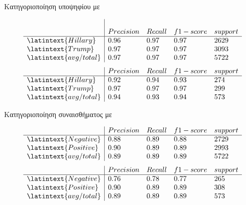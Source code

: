 \documentclass{beamer}
\begin{document}
\begin{frame}
\begin{flushleft}
{\color{blue}Κατηγοριοποίηση υποψηφίου με {}} 
\end{flushleft}
\vfill
{}
\[
\left. {\begin{array}{l|llll}\\
 &Precision & Recall & f1-score & support \\
\hline
{\latintext{Hillary}} & 0.96 & 0.97 & 0.97 & 2629  \\
{\latintext{Trump}} & 0.97 & 0.97 & 0.97 & 3093 \\
{\latintext{avg/total}} & 0.97 & 0.97 & 0.97 & 5722
\end{array} } \right.
\]
{}
\[
\left. {\begin{array}{l|llll}
 &Precision & Recall & f1-score & support \\
\hline
{\latintext{Hillary}} & 0.92 & 0.94 & 0.93 & 274  \\
{\latintext{Trump}} & 0.97 & 0.97 & 0.97 & 299 \\
{\latintext{avg/total}} & 0.94 & 0.93 & 0.94 & 573
\end{array} } \right.
\]
\end{frame}

\begin{frame}
\begin{flushleft}
{\color{blue}Κατηγοριοποίηση συναισθήματος με {}} 
\end{flushleft}
\vfill
{}
\[
\left. {\begin{array}{l|llll}
 &Precision & Recall & f1-score & support \\
\hline
{\latintext{Negative}} & 0.88 & 0.89 & 0.88 & 2729  \\
{\latintext{Positive}} & 0.90 & 0.89 & 0.89 & 2993 \\
{\latintext{avg/total}} & 0.89 & 0.89 & 0.89 & 5722
\end{array} } \right.
\]
{}
\vfill
\[
\left. {\begin{array}{l|llll}
 &Precision & Recall & f1-score & support \\
\hline
{\latintext{Negative}} & 0.76 & 0.78 & 0.77 & 265  \\
{\latintext{Positive}} & 0.90 & 0.89 & 0.89 & 308 \\
{\latintext{avg/total}} & 0.89 & 0.89 & 0.89 & 573
\end{array} } \right.
\]
\end{frame}
\end{document}
